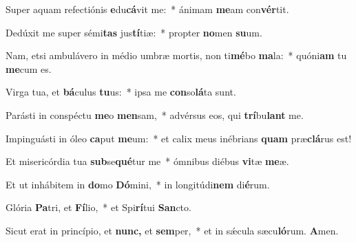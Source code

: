 \item Super aquam refectiónis \textbf{e}du\textbf{cá}vit me:~* ánimam \textbf{me}am con\textbf{vér}tit.
\item Dedúxit me super sémi\textbf{tas} jus\textbf{tí}tiæ:~* propter \textbf{no}men \textbf{su}um.
\item Nam, etsi ambulávero in médio umbræ mortis, non ti\textbf{mé}bo \textbf{ma}la:~* quóni\textbf{am} tu \textbf{me}cum es.
\item Virga tua, et \textbf{bá}culus \textbf{tu}us:~* ipsa me \textbf{con}so\textbf{lá}ta sunt.
\item Parásti in conspéctu \textbf{me}o \textbf{men}sam,~* advérsus eos, qui \textbf{trí}bu\textbf{lant} me.
\item Impinguásti in óleo \textbf{ca}put \textbf{me}um:~* et calix meus inébrians \textbf{quam} præ\textbf{clá}rus est!
\item Et misericórdia tua \textbf{sub}se\textbf{qué}tur me~* ómnibus diébus \textbf{vi}tæ \textbf{me}æ.
\item Et ut inhábitem in \textbf{do}mo \textbf{Dó}mini,~* in longitúdi\textbf{nem} di\textbf{é}rum.
\item Glória \textbf{Pa}tri, et \textbf{Fí}lio,~* et Spi\textbf{rí}tui \textbf{San}cto.
\item Sicut erat in princípio, et \textbf{nunc,} et \textbf{sem}per,~* et in sǽcula sæcu\textbf{ló}rum. \textbf{A}men.
